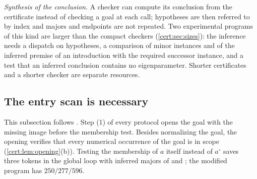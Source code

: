 \emph{Synthesis of the conclusion.} A checker can compute its conclusion from
the certificate instead of checking a goal at each call; hypotheses are then
referred to by index and majors and endpoints are not repeated. Two
experimental programs of this kind are larger than the compact checkers
(\cref{cert:sec:sizes}): the inference needs a dispatch on hypotheses, a
comparison of minor instances and of the inferred premise of an introduction
with the required successor instance, and a test that an inferred conclusion
contains no eigenparameter. Shorter certificates and a shorter checker are
separate resources.

\subsection{The entry scan is necessary}\label{cert:sec:entry-scan}

This subsection follows . Step (1) of every protocol
opens the goal with the missing image before the membership test. Besides
normalizing the goal, the opening verifies that every numerical occurrence of
the goal is in scope (\cref{cert:lem:opening}(b)). Testing the membership of
$a$ itself instead of $a^{\circ}$ saves three tokens in the global loop with
inferred majors of  and ; the
modified program has $250/277/596$.

